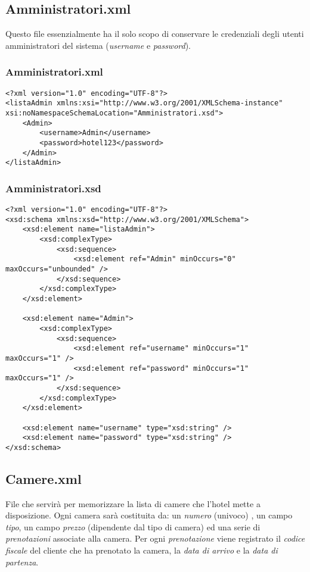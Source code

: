 \documentclass [a4paper, 12pt]{book}
\begin{document}
\subsection{Amministratori.xml}
Questo file essenzialmente ha il solo scopo di conservare le credenziali degli utenti amministratori del sistema (\textit{username} e \textit{password}).
\subsubsection{Amministratori.xml}
\begin{lstlisting}[style=XML]
<?xml version="1.0" encoding="UTF-8"?>
<listaAdmin xmlns:xsi="http://www.w3.org/2001/XMLSchema-instance" xsi:noNamespaceSchemaLocation="Amministratori.xsd">
    <Admin>
        <username>Admin</username>
        <password>hotel123</password>
    </Admin>
</listaAdmin> 
\end{lstlisting}
\subsubsection{Amministratori.xsd}
\begin{lstlisting}[style=XML]
<?xml version="1.0" encoding="UTF-8"?>
<xsd:schema xmlns:xsd="http://www.w3.org/2001/XMLSchema">
    <xsd:element name="listaAdmin">
        <xsd:complexType>
            <xsd:sequence>
                <xsd:element ref="Admin" minOccurs="0" maxOccurs="unbounded" />
            </xsd:sequence>
        </xsd:complexType>
    </xsd:element>

    <xsd:element name="Admin">
        <xsd:complexType>
            <xsd:sequence>
                <xsd:element ref="username" minOccurs="1" maxOccurs="1" />
                <xsd:element ref="password" minOccurs="1" maxOccurs="1" />
            </xsd:sequence>
        </xsd:complexType>
    </xsd:element>

    <xsd:element name="username" type="xsd:string" />
    <xsd:element name="password" type="xsd:string" />
</xsd:schema>
\end{lstlisting}
\subsection{Camere.xml}
File che servirà per memorizzare la lista di camere che l'hotel mette a disposizione. Ogni camera sarà costituita da: un \textit{numero} (univoco) , un campo \textit{tipo}, un campo \textit{prezzo} (dipendente dal tipo di camera) ed una serie di \textit{prenotazioni} associate alla camera. Per ogni \textit{prenotazione} viene registrato il \textit{codice fiscale} del cliente che ha prenotato la camera, la \textit{data di arrivo} e la \textit{data di partenza}.
\end{document}
